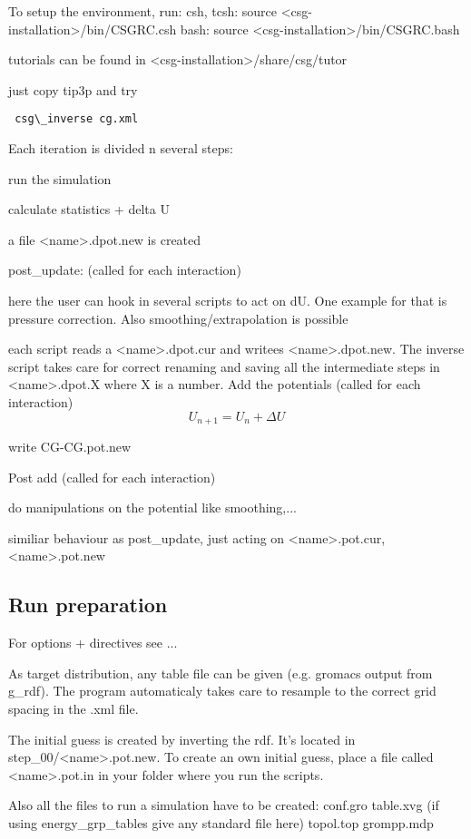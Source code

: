 To setup the environment, run:
csh, tcsh: source <csg-installation>/bin/CSGRC.csh
bash: source <csg-installation>/bin/CSGRC.bash   

tutorials can be found in
<csg-installation>/share/csg/tutor

just copy tip3p and try 

\begin{verbatim}
 csg\_inverse cg.xml
\end{verbatim}

Each iteration is divided n several steps:

run the simulation

calculate statistics + delta U

a file <name>.dpot.new is created

post\_update: (called for each interaction)

 here the user can hook in several scripts to act on dU. One example for that is pressure correction. Also 
smoothing/extrapolation is possible

 each script reads a <name>.dpot.cur and writees <name>.dpot.new. The inverse script takes care for correct renaming and saving all the intermediate steps in <name>.dpot.X where X is a number.
Add the potentials (called for each interaction)
\begin{equation}
  U_{n+1} = U_n + \Delta U
\end{equation}

write CG-CG.pot.new

Post add (called for each interaction)

do manipulations on the potential like smoothing,...

similiar behaviour as post\_update, just acting on <name>.pot.cur, <name>.pot.new

\subsection{Run preparation}
For options + directives see ...

As target distribution, any table file can be given (e.g. gromacs output from g\_rdf). The program automaticaly takes care to resample to the correct grid spacing in the .xml file.

The initial guess is created by inverting the rdf. It's located in step\_00/<name>.pot.new. To create an own initial guess, place a file called <name>.pot.in in your folder where you run the scripts.

Also all the files to run a simulation have to be created:
conf.gro
table.xvg  (if using energy\_grp\_tables give any standard file here)
topol.top
grompp.mdp


